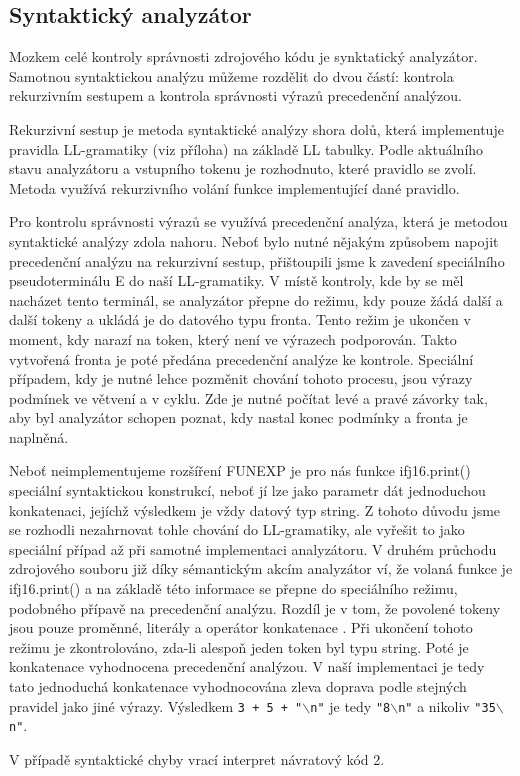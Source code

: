 \documentclass[a4paper, 11pt]{article}
\begin{document}
    \subsection{Syntaktický analyzátor}
    Mozkem celé kontroly správnosti zdrojového kódu je synktatický analyzátor. Samotnou syntaktickou analýzu můžeme rozdělit do dvou částí: kontrola rekurzivním sestupem a kontrola správnosti výrazů precedenční analýzou.\par
    Rekurzivní sestup je metoda syntaktické analýzy shora dolů, která implementuje pravidla LL-gramatiky (viz příloha) na základě LL tabulky. Podle aktuálního stavu analyzátoru a vstupního tokenu je rozhodnuto, které pravidlo se zvolí. Metoda využívá rekurzivního volání funkce implementující dané pravidlo.\par
    Pro kontrolu správnosti výrazů se využívá precedenční analýza, která je metodou syntaktické analýzy zdola nahoru. Neboť bylo nutné nějakým způsobem napojit precedenční analýzu na rekurzivní sestup, přištoupili jsme k zavedení speciálního pseudoterminálu E do naší LL-gramatiky. V místě kontroly, kde by se měl nacházet tento terminál, se analyzátor přepne do režimu, kdy pouze žádá další a další tokeny a ukládá je do datového typu fronta. Tento režim je ukončen v moment, kdy narazí na token, který není ve výrazech podporován. Takto vytvořená fronta je poté předána precedenční analýze ke kontrole. Speciální případem, kdy je nutné lehce pozměnit chování tohoto procesu, jsou výrazy podmínek ve větvení a v cyklu. Zde je nutné počítat levé a pravé závorky tak, aby byl analyzátor schopen poznat, kdy nastal konec podmínky a fronta je naplněná.\par
    Neboť neimplementujeme rozšíření FUNEXP je pro nás funkce ifj16.print() speciální syntaktickou konstrukcí, neboť jí lze jako parametr dát jednoduchou konkatenaci, jejíchž výsledkem je vždy datový typ string. Z tohoto důvodu jsme se rozhodli nezahrnovat tohle chování do LL-gramatiky, ale vyřešit to jako speciální případ až při samotné implementaci analyzátoru. V druhém průchodu zdrojového souboru již díky sémantickým akcím analyzátor ví, že volaná funkce je ifj16.print() a na základě této informace se přepne do speciálního režimu, podobného přípavě na precedenční analýzu. Rozdíl je v tom, že povolené tokeny jsou pouze proměnné, literály a operátor konkatenace \uv{+}. Při ukončení tohoto režimu je zkontrolováno, zda-li alespoň jeden token byl typu string. Poté je konkatenace vyhodnocena precedenční analýzou. V naší implementaci je tedy tato jednoduchá konkatenace vyhodnocována zleva doprava podle stejných pravidel jako jiné výrazy. Výsledkem \texttt{3 + 5 + "$\backslash$n"} je tedy \texttt{"8$\backslash$n"} a nikoliv \texttt{"35$\backslash$n"}.\par
    V případě syntaktické chyby vrací interpret návratový kód 2.
\end{document}

